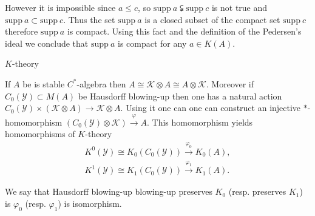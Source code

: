 \documentclass{beamer}
\theoremstyle{plain}
\newtheorem{empt}{}
\newcommand{\K}{\mathcal{K}}
\newcommand{\supp}{\mathrm{supp}}
\newcommand{\sY}{\mathcal{Y}}       %
\newcommand{\bean}{\begin{eqnarray*}}
\newcommand{\eean}{\end{eqnarray*}}
\begin{document}
\begin{frame}
However it is impossible since $a \le c$, so $\supp~ a \subsetneqq \supp ~c$ is not true and $\supp ~a \subset\supp ~c$. Thus the set $\supp~ a$ is a closed subset of the compact set $\supp~ c$ therefore $\supp~ a$ is compact. Using this fact and the definition of the Pedersen's ideal we conclude that $\supp~ a$ is compact for any $a \in K\left( A\right)$. 
	
	
\end{frame}
\begin{frame}
		\begin{center}
		\huge{$K$-theory}
	\end{center}
	If $A$ be is  stable $C^*$-algebra then $A \cong \K\otimes A\cong A\otimes \K$. Moreover if  $C_0\left( \sY\right) \subset M\left( A\right)$ be Hausdorff blowing-up then one has a  natural action 
	$
	C_0\left(\sY \right)\times  \left(\K\otimes A \right)\to \K\otimes A 
	$.
	Using it one can one can construct an  injective $*$-homomorphism
	$
	\left(C_0\left(\sY \right) \otimes \K \right) \xrightarrow{\varphi} A
	$.
	This homomorphism yields homomorphisms of $K$-theory
	\bean
	K^0\left(\sY \right)\cong K_0\left(C_0\left( \sY\right)  \right) \xrightarrow{\varphi_0} K_0\left( A\right),\\
	K^1\left(\sY \right)\cong K_1\left(C_0\left( \sY\right)  \right)\xrightarrow{\varphi_1} K_1\left( A\right).
	\eean
	\begin{definition}
	We say that Hausdorff blowing-up blowing-up \alert{preserves $K_0$} (resp.  \alert{preserves $K_1$}) is $\varphi_0$  (resp. $\varphi_1$) is isomorphism.
	\end{definition}
\end{frame}
\end{document}
